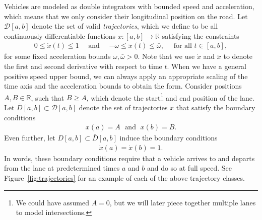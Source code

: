 \documentclass[a4paper]{article}
\theoremstyle{definition}
\theoremstyle{plain}
\begin{document}
Vehicles are modeled as double integrators with bounded speed and acceleration,
which means that we only consider their longitudinal position on the road. Let
$\mathcal{D}[a,b]$ denote the set of valid \emph{trajectories}, which we define to be
all continuously differentiable functions $x : [a,b] \rightarrow \mathbb{R}$ satisfying
the constraints
\begin{align}
  0 \leq \dot{x}(t) \leq 1 \quad \text{ and } \quad
  {-\omega} \leq \ddot{x}(t) \leq \bar{\omega} , \quad \text{ for all } t \in [a,b] ,
\end{align}
for some fixed acceleration bounds $\omega, \bar{\omega} > 0$. Note that we use $\dot{x}$
and $\ddot{x}$ to denote the first and second derivative with respect to time
$t$. When we have a general positive speed upper bound, we can always apply an
appropriate scaling of the time axis and the acceleration bounds to obtain the
form.
%
Consider positions $A, B \in \mathbb{R}$, such that $B \geq A$, which denote the
start\footnote{We could have assumed $A=0$, but we will later piece together
  multiple lanes to model intersections.} and end position of the lane.
%
Let $\bar{D}[a, b] \subset \mathcal{D}[a, b]$ denote the set of trajectories $x$ that
satisfy the boundary conditions
\begin{align}
  x(a) = A \; \text{ and } \; x(b) = B .
\end{align}
Even further, let $D[a,b] \subset \bar{D}[a, b]$ induce the boundary conditions
\begin{align}
  \dot{x}(a) = \dot{x}(b) = 1 .
\end{align}
In words, these boundary conditions require that a vehicle arrives to and
departs from the lane at predetermined times $a$ and $b$ and do so at full
speed.
%
See Figure~\ref{fig:trajectories} for an example of each of the above trajectory
classes.
\end{document}
